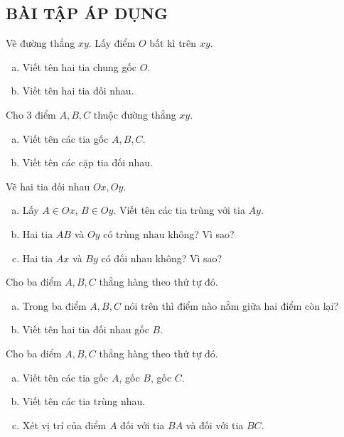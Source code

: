 \subsection{BÀI TẬP ÁP DỤNG}
\begin{bt}
Vẽ đường thẳng $xy$. Lấy điểm $O$ bất kì trên $xy$.
\begin{enumerate}[a)]
\item	Viết tên hai tia chung gốc $O$.
\item	Viết tên hai tia đối nhau.
\end{enumerate}
\end{bt}   \begin{bt}
Cho $3$ điểm $A, B, C$ thuộc đường thẳng $xy$.
\begin{enumerate}[a)]
\item	Viết tên các tia gốc $A, B, C$.
\item	Viết tên các cặp tia đối nhau.
\end{enumerate}
\end{bt}   \begin{bt}
Vẽ hai tia đối nhau $Ox, Oy$.
\begin{enumerate}[a)]
\item	Lấy $A \in Ox$, $B \in Oy$. Viết tên các tia trùng với tia $Ay$.
\item	Hai tia $AB$ và $Oy$ có trùng nhau không? Vì sao?
\item	Hai tia $Ax$ và $By$ có đối nhau không? Vì sao?
\end{enumerate}
\end{bt}   \begin{bt}
Cho ba điểm $A, B, C$ thẳng hàng theo thứ tự đó.
\begin{enumerate}[a)]
\item	Trong ba điểm $A, B, C$ nói trên thì điểm nào nằm giữa hai điểm còn lại?
\item	Viết tên hai tia đối nhau gốc $B$.
\end{enumerate}
\end{bt}   \begin{bt}
Cho ba điểm $A, B, C$ thẳng hàng theo thứ tự đó.
\begin{enumerate}[a)]
\item	Viết tên các tia gốc $A$, gốc $B$, gốc $C$.
\item	Viết tên các tia trùng nhau.
\item	Xét vị trí của điểm $A$ đối với tia $BA$ và đối với tia $BC$.
\end{enumerate}

\end{bt}
